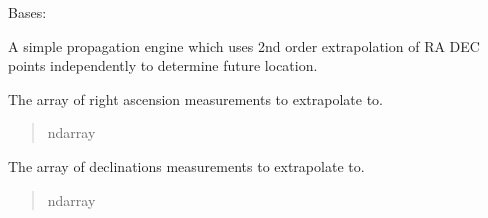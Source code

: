 \documentclass[letterpaper,11pt,english]{sphinxmanual}
\begin{document}
\begin{savenotes}\begin{fulllineitems}
\label{\detokenize{code/opihiexarata.propagate.polynomial:opihiexarata.propagate.polynomial.QuadraticPropagationEngine}}
\pysigstartsignatures
{}
\pysigstopsignatures
\sphinxAtStartPar
Bases: {\hyperref[\detokenize{code/opihiexarata.library.engine:opihiexarata.library.engine.PropagationEngine}]{}}

\sphinxAtStartPar
A simple propagation engine which uses 2nd order extrapolation of
RA DEC points independently to determine future location.

\begin{savenotes}\begin{fulllineitems}
\label{\detokenize{code/opihiexarata.propagate.polynomial:opihiexarata.propagate.polynomial.QuadraticPropagationEngine.ra_array}}
\pysigstartsignatures
{}
\pysigstopsignatures
\sphinxAtStartPar
The array of right ascension measurements to extrapolate to.
\begin{quote}\begin{description}
\sphinxAtStartPar
ndarray

\end{description}\end{quote}

\end{fulllineitems}\end{savenotes}


\begin{savenotes}\begin{fulllineitems}
\label{\detokenize{code/opihiexarata.propagate.polynomial:opihiexarata.propagate.polynomial.QuadraticPropagationEngine.dec_array}}
\pysigstartsignatures
{}
\pysigstopsignatures
\sphinxAtStartPar
The array of declinations measurements to extrapolate to.
\begin{quote}\begin{description}
\sphinxAtStartPar
ndarray


\end{description}
\end{quote}
\end{fulllineitems}
\end{savenotes}
\end{fulllineitems}
\end{savenotes}
\end{document}
